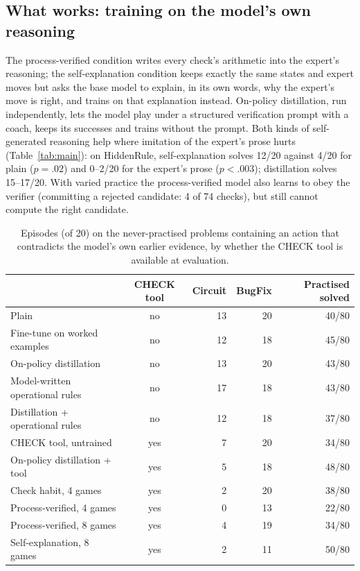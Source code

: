 \documentclass[11pt]{article}
\begin{document}
\subsection{What works: training on the model's own reasoning}
The process-verified condition writes every check's arithmetic into the expert's reasoning; the self-explanation
condition keeps exactly the same states and expert moves but asks the base model to explain, in its own words, why
the expert's move is right, and trains on that explanation instead. On-policy distillation, run independently,
lets the model play under a structured verification prompt with a coach, keeps its successes and trains without
the prompt. Both kinds of self-generated reasoning help where imitation of the expert's prose hurts
(Table~\ref{tab:main}): on HiddenRule, self-explanation solves 12/20 against 4/20 for plain ($p=.02$) and 0--2/20
for the expert's prose ($p<.003$); distillation solves 15--17/20. With varied practice the process-verified model
also learns to obey the verifier (committing a rejected candidate: 4 of 74 checks), but still cannot compute the
right candidate.

\begin{table}[h]
\centering\small
\begin{tabular}{lcrrr}
\toprule
 & CHECK tool & Circuit & BugFix & Practised solved \\
\midrule
Plain & no & 13 & 20 & 40/80 \\
Fine-tune on worked examples & no & 12 & 18 & 45/80 \\
On-policy distillation & no & 13 & 20 & 43/80 \\
Model-written operational rules & no & 17 & 18 & 43/80 \\
Distillation + operational rules & no & 12 & 18 & 37/80 \\
CHECK tool, untrained & yes & 7 & 20 & 34/80 \\
On-policy distillation + tool & yes & 5 & 18 & 48/80 \\
Check habit, 4 games & yes & 2 & 20 & 38/80 \\
Process-verified, 4 games & yes & 0 & 13 & 22/80 \\
Process-verified, 8 games & yes & 4 & 19 & 34/80 \\
Self-explanation, 8 games & yes & 2 & 11 & 50/80 \\
\bottomrule
\end{tabular}
\caption{Episodes (of 20) on the never-practised problems containing an action that contradicts the model's own
earlier evidence, by whether the CHECK tool is available at evaluation.}
\label{tab:contra}
\end{table}
\end{document}
